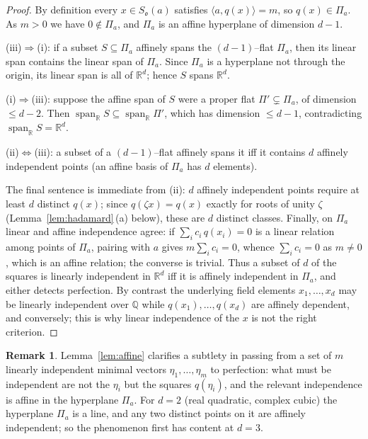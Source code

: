 \documentclass[11pt,reqno]{amsart}
\theoremstyle{plain}
\theoremstyle{definition}
\newtheorem{remark}[theorem]{Remark}
\newcommand{\Q}{\mathbb{Q}}
\newcommand{\R}{\mathbb{R}}
\newcommand{\Ok}{\mathfrak{o}}
\DeclareMathOperator{\spann}{span}
\begin{document}
\begin{proof}
By definition every $x\in S_\Ok(a)$ satisfies $\langle a,q(x)\rangle=m$, so $q(x)\in\Pi_a$. As $m>0$ we have
$0\notin\Pi_a$, and $\Pi_a$ is an affine hyperplane of dimension $d-1$.

(iii)$\Rightarrow$(i): if a subset $S\subseteq\Pi_a$ affinely spans the $(d-1)$--flat $\Pi_a$, then its
linear span contains the linear span of $\Pi_a$. Since $\Pi_a$ is a hyperplane not through the origin, its
linear span is all of $\R^d$; hence $S$ spans $\R^d$.

(i)$\Rightarrow$(iii): suppose the affine span of $S$ were a proper flat $\Pi'\subsetneq\Pi_a$, of dimension
$\le d-2$. Then $\spann_\R S\subseteq\spann_\R\Pi'$, which has dimension $\le d-1$, contradicting
$\spann_\R S=\R^d$.

(ii)$\Leftrightarrow$(iii): a subset of a $(d-1)$--flat affinely spans it iff it contains $d$ affinely
independent points (an affine basis of $\Pi_a$ has $d$ elements).

The final sentence is immediate from (ii): $d$ affinely independent points require at least $d$ distinct
$q(x)$; since $q(\zeta x)=q(x)$ exactly for roots of unity $\zeta$ (Lemma~\ref{lem:hadamard}\,(a) below),
these are $d$ distinct classes. Finally, on $\Pi_a$ linear and affine independence agree: if
$\sum_i c_i\,q(x_i)=0$ is a linear relation among points of $\Pi_a$, pairing with $a$ gives
$m\sum_i c_i=0$, whence $\sum_i c_i=0$ as $m\ne0$, which is an affine relation; the converse is trivial.
Thus a subset of $d$ of the squares is linearly independent in $\R^d$ iff it is affinely independent in
$\Pi_a$, and either detects perfection. By contrast the underlying field elements $x_1,\dots,x_d$ may be
linearly independent over $\Q$ while $q(x_1),\dots,q(x_d)$ are affinely dependent, and conversely; this is
why linear independence of the $x$ is not the right criterion.
\end{proof}

\begin{remark}
Lemma~\ref{lem:affine} clarifies a subtlety in passing from a set of $m$ linearly independent minimal
vectors $\eta_1,\dots,\eta_m$ to perfection: what must be independent are not the $\eta_i$ but the squares
$q(\eta_i)$, and the relevant independence is affine in the hyperplane $\Pi_a$. For $d=2$ (real quadratic,
complex cubic) the hyperplane $\Pi_a$ is a line, and any two distinct points on it are affinely independent;
so the phenomenon first has content at $d=3$.
\end{remark}
\end{document}
